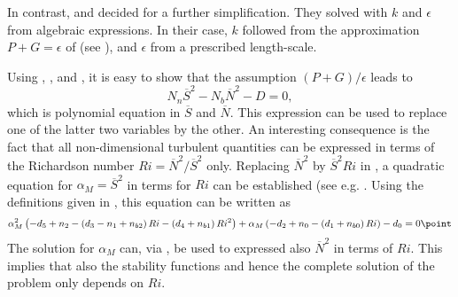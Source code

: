 In contrast, \cite{Canutoetal2001a} and \cite{Chengetal2002} decided
for a further simplification.  They solved  with $k$ and
$\epsilon$ from algebraic expressions. In their case, $k$ followed from the
approximation $P+G=\epsilon$ of  (see
), and $\epsilon$ from a prescribed length-scale.

Using , , and , it is easy to show that
the assumption $(P+G)/\epsilon$ leads to
\begin{equation}
  \label{FE}
     N_n \overline{S}^2 - N_b \overline{N}^2 - D = 0   
   \comma
\end{equation}
which is polynomial equation in $\overline{S}$ and
$\overline{N}$. This expression can be used to replace one of the
latter two variables by the other. An interesting consequence is the
fact that all non-dimensional turbulent quantities can be expressed in
terms of the Richardson number $Ri = \overline{N}^2 / \overline{S}^2$
only. Replacing $\overline{N}^2$ by $\overline{S}^2 Ri$ in
, a quadratic equation for $\alpha_M = \overline{S}^2$ in terms for $Ri$
can be established (see e.g. \cite{Chengetal2002}. Using the
definitions given in , this equation can be written as
\begin{equation}
 \label{SSEqRi}
    \alpha_M^2 \left( -d_5 + n_2 - \left( d_3 - n_1 + n_{b2}\right) Ri 
                                     - \left( d_4 + n_{b1}      \right) Ri^2  
                   \right)
  + \alpha_M   \left( -d_2 + n_0 - \left( d_1 + n_{b0}      \right) Ri
                   \right)
  - d_0 = 0	
  \point
\end{equation}
The solution for $\alpha_M$ can, via , be used to expressed also
$\overline{N}^2$ in terms of $Ri$. This implies that also the stability functions
and hence the complete solution of the problem only depends on $Ri$. 

